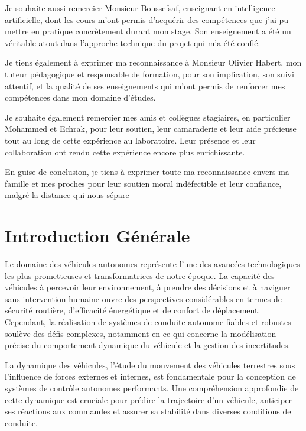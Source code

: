 \documentclass[12pt, a4paper]{report}
\begin{document}
Je souhaite aussi remercier Monsieur Boussefsaf, enseignant en intelligence artificielle, dont les cours m’ont permis d’acquérir des compétences que j’ai pu mettre en pratique concrètement durant mon stage. Son enseignement a été un véritable atout dans l’approche technique du projet qui m’a été confié.

Je tiens également à exprimer ma reconnaissance à Monsieur Olivier Habert, mon tuteur pédagogique et responsable de formation, pour son implication, son suivi attentif, et la qualité de ses enseignements qui m’ont permis de renforcer mes compétences dans mon domaine d’études.

Je souhaite également remercier mes amis et collègues stagiaires, en particulier Mohammed et Echrak, pour leur soutien, leur camaraderie et leur aide précieuse tout au long de cette expérience au laboratoire. Leur présence et leur collaboration ont rendu cette expérience encore plus enrichissante.

En guise de conclusion, je tiens à exprimer toute ma reconnaissance envers ma famille et mes proches pour leur soutien moral indéfectible et leur confiance, malgré la distance qui nous sépare

\thispagestyle{fancy}
\tableofcontents
\listoffigures
\listoftables
\thispagestyle{fancy}

\chapter*{\centering Introduction Générale } 
\thispagestyle{fancy}
Le domaine des véhicules autonomes représente l'une des avancées technologiques les plus prometteuses et transformatrices de notre époque. La capacité des véhicules à percevoir leur environnement, à prendre des décisions et à naviguer sans intervention humaine ouvre des perspectives considérables en termes de sécurité routière, d'efficacité énergétique et de confort de déplacement. Cependant, la réalisation de systèmes de conduite autonome fiables et robustes soulève des défis complexes, notamment en ce qui concerne la modélisation précise du comportement dynamique du véhicule et la gestion des incertitudes.

La dynamique des véhicules, l'étude du mouvement des véhicules terrestres sous l'influence de forces externes et internes, est fondamentale pour la conception de systèmes de contrôle autonomes performants. Une compréhension approfondie de cette dynamique est cruciale pour prédire la trajectoire d'un véhicule, anticiper ses réactions aux commandes et assurer sa stabilité dans diverses conditions de conduite.
\end{document}
